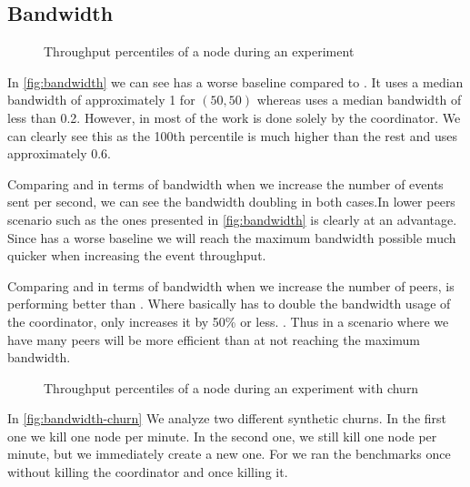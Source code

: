 \subsection{Bandwidth}
\begin{figure}[hpt]
	\centering
	
	\vspace{-2mm} 
	\caption{Throughput percentiles of a node during an experiment}
	\vspace{-2mm} 
	\label{fig:bandwidth}
\end{figure}
In \autoref{fig:bandwidth} we can see \epto has a worse baseline compared to \jgroups. It uses a median bandwidth of approximately \SI{1}{\mbps} for $(50,50)$ whereas \jgroups uses a median bandwidth of less than \SI{0.2}{\mbps}. However, in \jgroups most of the work is done solely by the coordinator. We can clearly see this as the 100th percentile is much higher than the rest and uses approximately \SI{.6}{\mbps}.

Comparing \epto and \jgroups in terms of bandwidth when we increase the number of events sent per second, we can see the bandwidth doubling in both cases.In lower peers scenario such as the ones presented in \autoref{fig:bandwidth} \jgroups is clearly at an advantage. Since \epto has a worse baseline we will reach the maximum bandwidth possible much quicker when increasing the event throughput.

Comparing \epto and \jgroups in terms of bandwidth when we increase the number of peers, \epto is performing better than \jgroups. Where \jgroups basically has to double the bandwidth usage of the coordinator, \epto only increases it by 50\% or less. . Thus in a scenario where we have many peers \epto will be more efficient than \jgroups at not reaching the maximum bandwidth.

\begin{figure}[hpt]
	\centering
	
	\vspace{-2mm} 
	\caption{Throughput percentiles of a node during an experiment with churn}
	\vspace{-2mm} 
	\label{fig:bandwidth-churn}
\end{figure}

In \autoref{fig:bandwidth-churn} We analyze two different synthetic churns. In the first one we kill one node per minute. In the second one, we still kill one node per minute, but we immediately create a new one. For \jgroups we ran the benchmarks once without killing the coordinator and once killing it.

